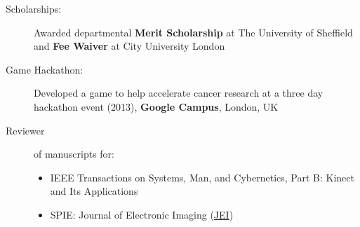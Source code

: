 \documentclass[letterpaper,11pt]{article}
\newcommand{\resitem}[1]{\item #1 \vspace{-2pt}}
\begin{document}
	\begin{description}
		\item[Scholarships:]{\footnotesize Awarded departmental \textbf{Merit Scholarship} at The University of Sheffield and \textbf{Fee Waiver} at City University London}
		\item[Game Hackathon:]{\footnotesize Developed a game to help accelerate cancer research at a three day hackathon event (2013), \textbf{Google Campus}, London, UK}
		\item[Reviewer]{\footnotesize of manuscripts for:}
		\begin{itemize}
			\resitem { \footnotesize IEEE Transactions on Systems, Man, and Cybernetics, Part B: Kinect and Its Applications}
			\resitem { \footnotesize SPIE: Journal of Electronic Imaging (\href{http://spie.org/x868.xml}{JEI})}
		\end{itemize}
		
	\end{description}
	
\end{document}
